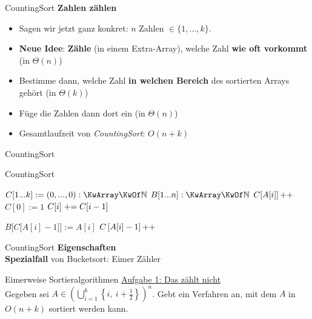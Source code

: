 \begin{frame}{CountingSort}
	\textbf{Zahlen zählen} 
	\begin{itemize}
		\item Sagen wir jetzt ganz konkret: $n$ Zahlen $\in \{1,...,k\}$.
		\pause
		\item \textbf{Neue Idee}: \textbf{Zähle} (in einem Extra-Array), welche Zahl \textbf{wie oft vorkommt} (in $\Theta(n)$)
		\pause
		\item Bestimme dann, welche Zahl \textbf{in welchen Bereich} des sortierten Arrays gehört (in $\Theta(k)$)
		\pause
		\item Füge die Zahlen dann dort ein (in $\Theta(n)$)
		\pause
		\item Gesamtlaufzeit von \emph{CountingSort}: $O(n + k)$
	\end{itemize}
\end{frame}

\begin{frame}{CountingSort}
	\begin{exampleblock}{CountingSort}
		\begin{algorithm}[H]
			\small
			 {
				$C[1...k] := (0,...,0) : \KwArray \KwOf \N$  \;
				$B[1...n] : \KwArray \KwOf \N$  \;
				 {
					$C[A[i]]\operatorname{++}$\;
				}
				$C[0] := 1$\;
				 {
					$C[i] \mathrel{+}= C[i-1]$\;
				}
				
				 {
					$B\Big[C\big[A[i]-1\big]\Big] := A[i]$ 
					$C\left[A[i]-1\right]\operatorname{++}$ 
				}
				\;
			}
		\end{algorithm}
	\end{exampleblock}
\end{frame}

\begin{frame}{CountingSort}
	\textbf{Eigenschaften}  \\
	\impl \textbf{Spezialfall} von Bucketsort: Eimer \entspr Zähler \\
	\pause
	\QuestionVspace
\end{frame}

\begin{frame}{Eimerweise Sortieralgorithmen}
	\underline{Aufgabe 1: Das zählt nicht} \\
	Gegeben sei $ A \in \left( \bigcup\limits_{i=1}^{k} \left\lbrace i,\ i+\frac{1}{2} \right\rbrace\right)^n$. Gebt ein Verfahren an, mit dem $A$ in $O(n + k)$ sortiert werden kann. 
\end{frame}

